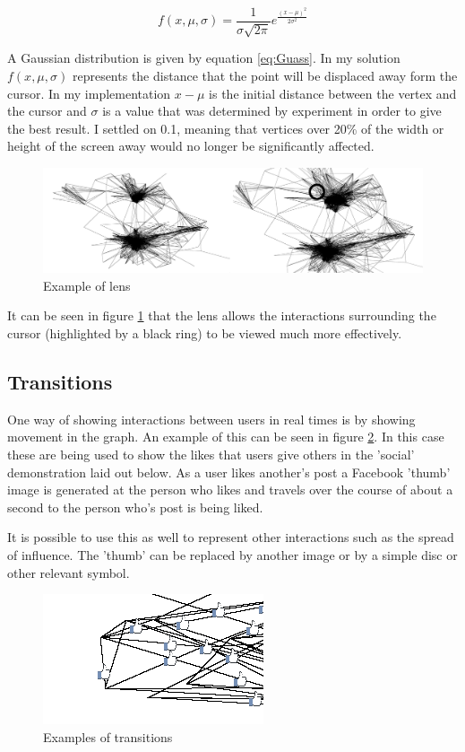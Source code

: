 \documentclass[12pt,a4paper]{article}
\begin{document}
\begin{equation}
\label{eq:Guass}
f(x,\mu,\sigma)=\frac{1}{\sigma\sqrt{2\pi}}e^{\frac{(x-\mu)^{2}}{2\sigma^{2}}}
\end{equation}

A Gaussian distribution is given by equation \ref{eq:Guass}. In my solution $f(x, \mu, \sigma)$ represents the distance that the point will be displaced away form the cursor. In my implementation $x-\mu$ is the initial distance between the vertex and the cursor and $\sigma$ is a value that was determined by experiment in order to give the best result. I settled on 0.1, meaning that vertices over 20\% of the width or height of the screen away would no longer be significantly affected.

\begin{figure}[htb]
\caption{Example of lens}
\label{fig:lens}
\centering
\includegraphics[scale=0.12]{Gaussian.png}
\end{figure}

It can be seen in figure \ref{fig:lens} that the lens allows the interactions surrounding the cursor (highlighted by a black ring) to be viewed much more effectively.

\subsection{Transitions}

One way of showing interactions between users in real times is by showing movement in the graph. An example of this can be seen in figure \ref{fig:transitions}. In this case these are being used to show the likes that users give others in the 'social' demonstration laid out below. As a user likes another's post a Facebook 'thumb' image is generated at the person who likes and travels over the course of about a second to the person who's post is being liked.

It is possible to use this as well to represent other interactions such as the spread of influence. The 'thumb' can be replaced by another image or by a simple disc or other relevant symbol.

\begin{figure}[htb]
\caption{Examples of transitions}
\label{fig:transitions}
\centering
\includegraphics[scale=1]{Transitions.png}
\end{figure}
\end{document}
